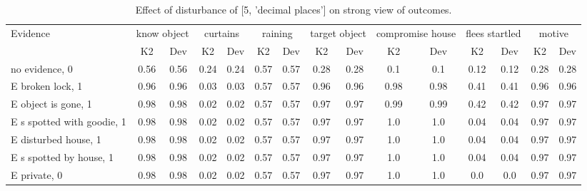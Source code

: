 \begin{table}\begin{tabular}{l|cc|cc|cc|cc|cc|cc|cc}\toprule\multirow{2}{*}{Evidence} & \multicolumn{2}{c}{know object}& \multicolumn{2}{c}{curtains}& \multicolumn{2}{c}{raining}& \multicolumn{2}{c}{target object}& \multicolumn{2}{c}{compromise house}& \multicolumn{2}{c}{flees startled}& \multicolumn{2}{c}{motive}\\& {K2} & {Dev}& {K2} & {Dev}& {K2} & {Dev}& {K2} & {Dev}& {K2} & {Dev}& {K2} & {Dev}& {K2} & {Dev}\\\midrule
no evidence, 0 & 0.56&0.56&0.24&0.24&0.57&0.57&0.28&0.28&0.1&0.1&0.12&0.12&0.28&0.28\\E broken lock, 1 & 0.96&0.96&0.03&0.03&0.57&0.57&0.96&0.96&0.98&0.98&0.41&0.41&0.96&0.96\\E object is gone, 1 & 0.98&0.98&0.02&0.02&0.57&0.57&0.97&0.97&0.99&0.99&0.42&0.42&0.97&0.97\\E s spotted with goodie, 1 & 0.98&0.98&0.02&0.02&0.57&0.57&0.97&0.97&1.0&1.0&0.04&0.04&0.97&0.97\\E disturbed house, 1 & 0.98&0.98&0.02&0.02&0.57&0.57&0.97&0.97&1.0&1.0&0.04&0.04&0.97&0.97\\E s spotted by house, 1 & 0.98&0.98&0.02&0.02&0.57&0.57&0.97&0.97&1.0&1.0&0.04&0.04&0.97&0.97\\E private, 0 & 0.98&0.98&0.02&0.02&0.57&0.57&0.97&0.97&1.0&1.0&0.0&0.0&0.97&0.97\\\bottomrule\end{tabular}\caption{Effect of disturbance of [5, 'decimal places'] on strong view of outcomes.}\end{table}